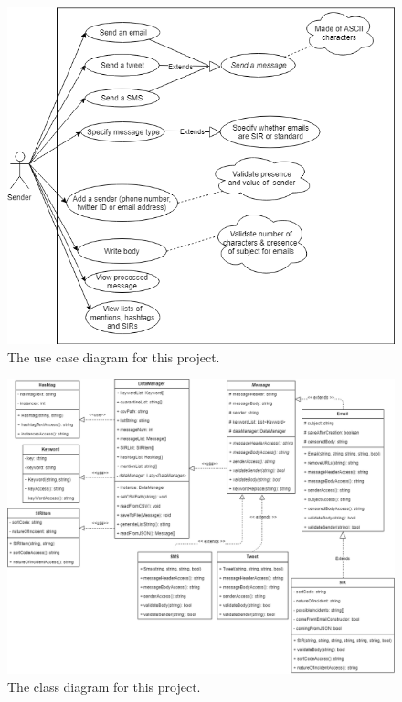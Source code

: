 \documentclass[a4paper]{article}
\begin{document}
\begin{thebibliography}{9}
\begin{figure}
\centering
\includegraphics[width=1\textwidth]{UseCaseSET09102Updated2.png}
\caption{\label{fig:usecase}The use case diagram for this project.}
\end{figure}

\begin{figure}
\centering
\includegraphics[width=1\textwidth]{ClassDiagramFinal.png}
\caption{\label{fig:class}The class diagram for this project.}
\end{figure}


  
  
\end{thebibliography}
\end{document}

